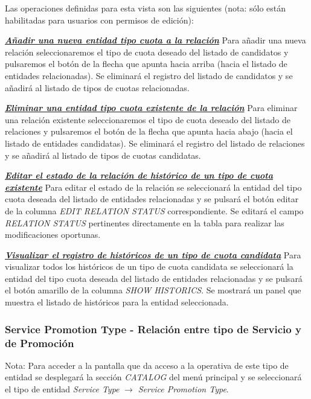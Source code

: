Las operaciones definidas para esta vista son las siguientes (nota: sólo están habilitadas para usuarios con permisos de edición):

\underline{\textsl{\textbf{Añadir una nueva entidad tipo cuota a la relación}}} \newline
Para añadir una nueva relación seleccionaremos el tipo de cuota deseado del listado de candidatos y pulsaremos el botón de la flecha que apunta hacia arriba (hacia el listado de entidades relacionadas). Se eliminará el registro del listado de candidatos y se añadirá al listado de tipos de cuotas relacionadas.


\underline{\textsl{\textbf{Eliminar una entidad tipo cuota existente de la relación}}}\newline
Para eliminar una relación existente seleccionaremos el tipo de cuota deseado del listado de relaciones y pulsaremos el botón de la flecha que apunta hacia abajo (hacia el listado de entidades candidatas). Se eliminará el registro del listado de relaciones y se añadirá al listado de tipos de cuotas candidatas.


\underline{\textsl{\textbf{Editar el estado de la relación de histórico de un tipo de cuota existente}}}
Para editar el estado de la relación se seleccionará la entidad del tipo cuota deseada del listado de entidades relacionadas y se pulsará el botón editar de la columna \textit{EDIT RELATION STATUS} correspondiente. Se editará el campo \emph{RELATION STATUS}  pertinentes directamente en la tabla para realizar las modificaciones oportunas.

\underline{\textsl{\textbf{Visualizar el registro de históricos de un tipo de cuota candidata}}}
Para visualizar todos los históricos de un tipo de cuota candidata se seleccionará la entidad del tipo cuota deseada del listado de entidades relacionadas y se pulsará el botón amarillo de la columna \textit{SHOW HISTORICS}. Se mostrará un panel que muestra el listado de históricos para la entidad seleccionada. 



\subsubsection{Service Promotion Type - Relación entre tipo de Servicio y de Promoción}
\label{sub:product-promotion-type-relation}

Nota: Para acceder a la pantalla que da acceso a la operativa de este tipo de entidad se desplegará la sección \emph{CATALOG} del menú principal y se seleccionará el tipo de entidad \emph{Service Type} $\rightarrow$  \emph{Service Promotion Type}.


